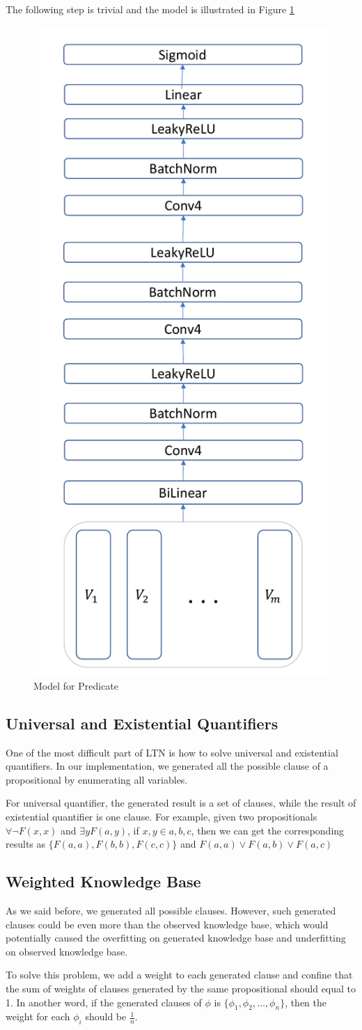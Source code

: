 The following step is trivial and the model is illustrated in Figure \ref{fig:CLTN_predicate}

\begin{figure}
    \centering
    \includegraphics[width=.4\textwidth]{img/CLTN_Predicate.pdf}
    \caption{Model for Predicate}
    \label{fig:CLTN_predicate}
\end{figure}

\subsection{Universal and Existential Quantifiers}

One of the most difficult part of LTN is how to solve universal and existential quantifiers. In our implementation, we generated all the possible clause of a propositional by enumerating all variables.

For universal quantifier, the generated result is a set of clauses, while the result of existential quantifier is one clause. For example, given two propositionals $\forall \neg F(x, x)$ and $\exists y F(a,y)$, if $x,y \in {a,b,c}$, then we can get the corresponding results as $\{F(a,a),F(b,b),F(c,c)\}$ and $F(a,a)\vee F(a,b) \vee F(a,c)$

\subsection{Weighted Knowledge Base}

As we said before, we generated all possible clauses. However, such generated clauses could be even more than the observed knowledge base, which would potentially caused the overfitting on generated knowledge base and underfitting on observed knowledge base.

To solve this problem, we add a weight to each generated clause and confine that the sum of weights of clauses generated by the same propositional should equal to 1. In another word, if the generated clauses of $\phi$ is $\{\phi_1,\phi_2, \dots, \phi_n\}$, then the weight for each $\phi_i$ should be $\frac{1}{n}$.
